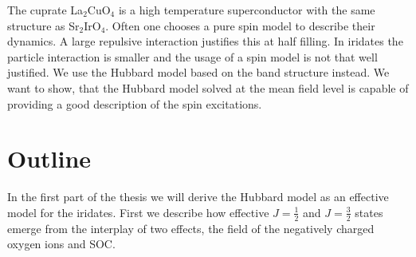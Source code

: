 The cuprate La$_2$CuO$_4$ is a high temperature superconductor with the same structure as Sr$_2$IrO$_4$. 
Often one chooses a pure spin model to describe their dynamics. 
A large repulsive interaction justifies this at half filling.
In iridates the particle interaction is smaller and the usage of a spin model is not that well justified.
We use the Hubbard model based on the band structure  instead. 
We want to show, that the Hubbard model solved at the mean field level is capable of providing a good description of the spin excitations.













\section{Outline}
In the first part of the thesis we will derive the Hubbard model as an effective model for the iridates. 
First we describe how effective $J= \frac12$ and $J=\frac32$ states emerge from the interplay of two 
effects, the field of the negatively charged oxygen ions and SOC. 


